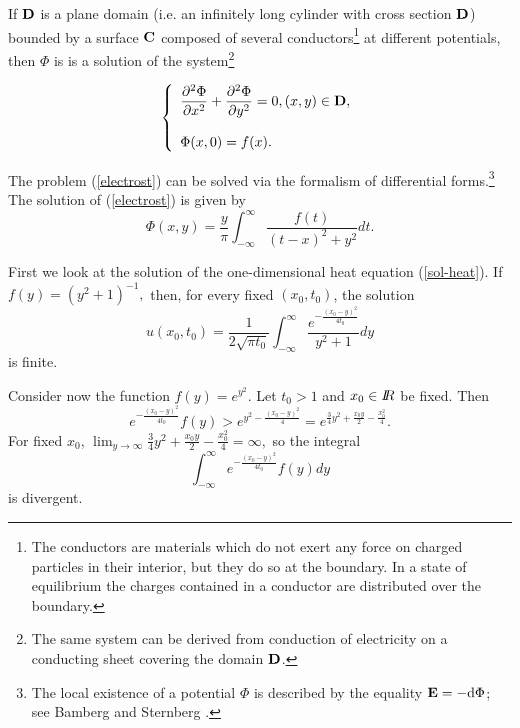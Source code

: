 If ${\bf D}$ is a plane domain (i.e. an infinitely long cylinder with cross
section ${\bf D}$) bounded by a
surface
 ${\bf C}$ composed of several
conductors\footnote{The conductors are materials which do not exert any
force on charged particles in their interior, but they do so at the
boundary. In a state of equilibrium the charges contained in a conductor
are distributed over the boundary.} at different potentials, then $\Phi$ is
 is a solution of the
system\footnote{The
same system can be derived from conduction of electricity on a conducting
sheet covering the domain ${\bf D}$.}

        \begin{equation}\label{electrost}
                \left\{\begin{array}{lc}
\displaystyle\frac{\partial^2 \Phi }{\partial x^2} +
\frac{\partial^2 \Phi }{\partial y^2} = 0,   (x,y)\in {\bf D},\\
%
\\
\Phi (x,0) = f(x).
                \end{array}\right.
        \end{equation}


The problem (\ref{electrost}) can be solved via the formalism
of differential forms.\footnote{The
local existence of a potential $\Phi$ is described by the equality
${\bf E} = -{\rm d  }  \Phi$; see Bamberg and Sternberg \cite{bs}.}
The solution of (\ref{electrost}) is given by
        \begin{equation}\label{sol-electrost}
\displaystyle   \Phi (x,y) =
\frac{y}{\pi}\int_{-\infty}^{\infty}\frac{f(t)}{(t-x)^2+y^2} dt.
        \end{equation}




        First we look at the solution of the one-dimensional heat equation
(\ref{sol-heat}).
If $f(y) = (y^2+1)^{-1},$ then, for every fixed $(x_0,t_0)$, the
solution \[u(x_0,t_0) = \frac{1}{2\sqrt{\pi t_0}}\int_{-\infty}^{\infty}
\frac{e^{-\frac{(x_0-y)^2}{4t_0}}}{y^2+1}dy \] is finite.


      Consider now the function $f(y) = e^{y^2}$.
Let $t_0>1$ and $x_0\in I\!\!R$ be fixed. Then
\[ e^{-\frac{(x_0-y)^2}{4t_0}} f(y) > e^{y^2 - \frac{(x_0-y)^2}{4}} =
e^{\frac{3}{4}y^2 + \frac{x_0y}{2} - \frac{x_0^2}{4}}.\]
       For  fixed $x_0$,
$\lim_{y\rightarrow\infty}\frac{3}{4}y^2 + \frac{x_0y}{2} - \frac{x_0^2}{4}
= \infty,$
so the integral
\[ \int_{-\infty}^{\infty} e^{-\frac{(x_0-y)^2}{4t_0}} f(y) dy\]
is divergent.

